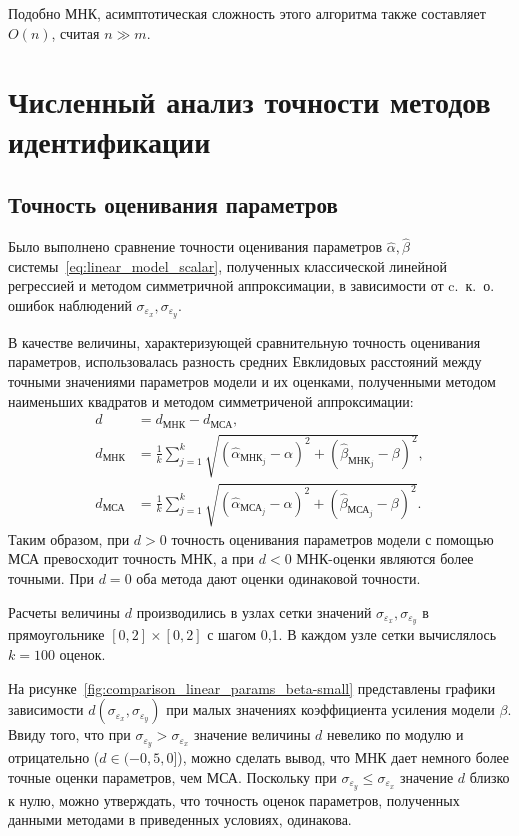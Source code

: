 Подобно МНК, асимптотическая сложность этого алгоритма также составляет \( O(n) \),
считая \( n \gg m \).


\section{Численный анализ точности методов идентификации}

\subsection{Точность оценивания параметров}

Было выполнено сравнение точности оценивания параметров
\( \hat{\alpha}, \hat{\beta} \) системы~\eqref{eq:linear_model_scalar},
полученных классической линейной регрессией и методом симметричной аппроксимации,
в зависимости от c.~к.~о. ошибок наблюдений \( \sigma_{\varepsilon_x}, \sigma_{\varepsilon_y} \).

В качестве величины, характеризующей сравнительную точность оценивания параметров,
использовалась разность средних Евклидовых расстояний
между точными значениями параметров модели и их оценками,
полученными методом наименьших квадратов и методом симметриченой аппроксимации:
\begin{equation*}
  \begin{aligned}
    d &= d_{\text{МНК}} - d_{\text{МСА}}, \\
    d_{\text{МНК}} &= \frac{1}{k} \sum_{j=1}^k \sqrt{(\hat{\alpha}_{\text{МНК}_j} - \alpha)^2 + (\hat{\beta}_{\text{МНК}_j} - \beta)^2}, \\
    d_{\text{МСА}} &= \frac{1}{k} \sum_{j=1}^k \sqrt{(\hat{\alpha}_{\text{МСА}_j} - \alpha)^2 + (\hat{\beta}_{\text{МСА}_j} - \beta)^2}.
    \end{aligned}
\end{equation*}
Таким образом, при \( d > 0 \) точность оценивания параметров модели с помощью МСА
превосходит точность МНК, а при \( d < 0 \) МНК-оценки являются более точными.
При \( d = 0 \) оба метода дают оценки одинаковой точности.

Расчеты величины \( d \) производились в узлах сетки значений
\( \sigma_{\varepsilon_x}, \sigma_{\varepsilon_y} \) в прямоугольнике
\( [0, 2] \times [0, 2] \) с шагом 0{,}1.
В каждом узле сетки вычислялось \( k = 100 \) оценок.

На рисунке~\ref{fig:comparison_linear_params_beta-small}
представлены графики зависимости \( d(\sigma_{\varepsilon_x}, \sigma_{\varepsilon_y}) \)
при малых значениях коэффициента усиления модели \( \beta \).
Ввиду того, что при \( \sigma_{\varepsilon_y} > \sigma_{\varepsilon_x} \)
значение величины \( d \) невелико по модулю и отрицательно (\( d \in ( -0{,}5, 0 ] \)),
можно сделать вывод, что МНК дает немного более точные оценки параметров, чем МСА.
Поскольку при \( \sigma_{\varepsilon_y} \le \sigma_{\varepsilon_x} \) значение
\( d \) близко к нулю, можно утверждать, что точность оценок параметров,
полученных данными методами в приведенных условиях, одинакова.

